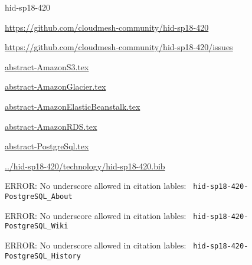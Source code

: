 \begin{IU}

hid-sp18-420

\url{https://github.com/cloudmesh-community/hid-sp18-420}

\url{https://github.com/cloudmesh-community/hid-sp18-420/issues}

\href{https://github.com/cloudmesh-community/hid-sp18-420/blob/master//technology/abstract-AmazonS3.tex}{abstract-AmazonS3.tex}

\href{https://github.com/cloudmesh-community/hid-sp18-420/blob/master//technology/abstract-AmazonGlacier.tex}{abstract-AmazonGlacier.tex}

\href{https://github.com/cloudmesh-community/hid-sp18-420/blob/master//technology/abstract-AmazonElasticBeanstalk.tex}{abstract-AmazonElasticBeanstalk.tex}

\href{https://github.com/cloudmesh-community/hid-sp18-420/blob/master//technology/abstract-AmazonRDS.tex}{abstract-AmazonRDS.tex}

\href{https://github.com/cloudmesh-community/hid-sp18-420/blob/master//technology/abstract-PostgreSql.tex}{abstract-PostgreSql.tex}

\href{https://github.com/cloudmesh-community/hid-sp18-420/blob/master//technology/hid-sp18-420.bib}{../hid-sp18-420/technology/hid-sp18-420.bib}

 ERROR: No underscore allowed in citation lables: \verb| hid-sp18-420-PostgreSQL_About |

 ERROR: No underscore allowed in citation lables: \verb| hid-sp18-420-PostgreSQL_Wiki |

 ERROR: No underscore allowed in citation lables: \verb| hid-sp18-420-PostgreSQL_History |

\end{IU}



